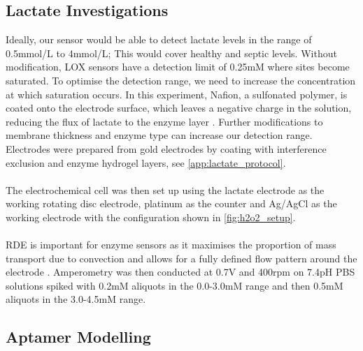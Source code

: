 \subsection{Lactate Investigations}
Ideally, our sensor would be able to detect lactate levels in the range of 0.5mmol/L to 4mmol/L; This would cover healthy and septic levels. Without modification, LOX sensors have a detection limit of 0.25mM where sites become saturated. To optimise the detection range, we need to increase the concentration at which saturation occurs. In this experiment,  Nafion, a sulfonated polymer, is coated onto the electrode surface, which leaves a negative charge in the solution, reducing the flux of lactate to the enzyme layer \cite{rathee2016biosensors} \cite{romero2010amperometric}. Further modifications to membrane thickness and enzyme type can increase our detection range. Electrodes were prepared from gold electrodes by coating with interference exclusion and enzyme hydrogel layers, see \autoref{app:lactate_protocol}.\\\\
The electrochemical cell was then set up using the lactate electrode as the working rotating disc electrode, platinum as the counter and Ag/AgCl as the working electrode with the configuration shown in \autoref{fig:h2o2_setup}.\\\\
RDE is important for enzyme sensors as it maximises the proportion of mass transport due to convection and allows for a fully defined flow pattern around the electrode \cite{nikolic2000theoretical}. Amperometry was then conducted at 0.7V and 400rpm on 7.4pH PBS solutions spiked with 0.2mM aliquots in the 0.0-3.0mM range and then 0.5mM aliquots in the 3.0-4.5mM range. \subsection{Aptamer Modelling}
